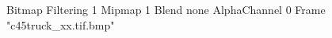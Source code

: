 {Bitmap
	{Filtering 1}
	{Mipmap 1}
	{Blend none}
	{AlphaChannel 0}
	{Frame "c45truck_xx.tif.bmp"}
}
